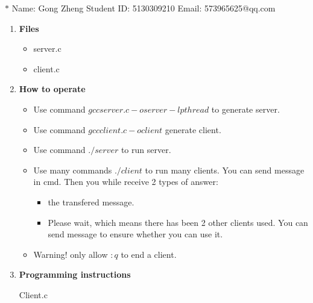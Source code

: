 \documentclass[12pt,a4paper]{article}
\newtheorem*{instruction}{Instruction}
\theoremstyle{definition}
\begin{document}
\noindent

\noindent{}
\begin{center}

\footnotesize{\color{blue}$*$ Name: Gong Zheng  \quad Student ID: 5130309210 \quad Email: 573965625@qq.com}
\end{center}
\begin{enumerate}
	\item \textbf{Files}
	\begin{itemize}
		\item server.c
		\item client.c
	\end{itemize}

	\item \textbf{How to operate}
	\begin{itemize}
		\item Use command $gcc server.c -o server -lpthread$ to generate server. 
		\item Use command $gcc client.c -o client $ generate client.
		\item Use command $./server$ to run server.
		\item Use many commands $./client$ to run many clients. You can send message in cmd. Then you while receive 2 types of answer:
		\begin{itemize}
			\item the transfered message.
			\item Please wait, which means there has been 2 other clients used. You can send message to ensure whether you can use it.
		\end{itemize}
		\item  {\color{red}Warning!} only allow $:q$ to end a client.
	\end{itemize}

	\item \textbf{Programming instructions}

	Client.c
\end{enumerate}
\end{document}
